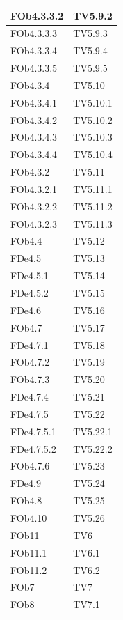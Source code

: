\begin{longtable}{|p{2.5cm}|p{5cm}|}
\hline
FOb4.3.3.2 & TV5.9.2\\
\hline
FOb4.3.3.3 & TV5.9.3\\
\hline
FOb4.3.3.4 & TV5.9.4\\
\hline
FOb4.3.3.5 & TV5.9.5\\
\hline
FOb4.3.4 & TV5.10\\ %
\hline
FOb4.3.4.1 & TV5.10.1\\
\hline
FOb4.3.4.2 & TV5.10.2\\
\hline
FOb4.3.4.3 & TV5.10.3\\
\hline
FOb4.3.4.4 & TV5.10.4\\
\hline
FOb4.3.2 & TV5.11\\ %
\hline
FOb4.3.2.1 & TV5.11.1\\
\hline
FOb4.3.2.2 & TV5.11.2\\
\hline
FOb4.3.2.3 & TV5.11.3\\
\hline
FOb4.4 & TV5.12\\ %
\hline
FDe4.5 & TV5.13\\ %
\hline
FDe4.5.1 & TV5.14\\  %
\hline
FDe4.5.2 & TV5.15\\ %
\hline
FDe4.6 & TV5.16\\ %
\hline
FOb4.7 & TV5.17\\ %
\hline
FDe4.7.1 & TV5.18\\ %
\hline
FOb4.7.2 & TV5.19\\ %
\hline
FOb4.7.3 & TV5.20\\ %
\hline
FDe4.7.4 & TV5.21\\ %
\hline
FDe4.7.5 & TV5.22\\ %
\hline
FDe4.7.5.1 & TV5.22.1\\ %
\hline
FDe4.7.5.2 & TV5.22.2\\ %
\hline 
FOb4.7.6 & TV5.23\\ %
\hline 
FDe4.9 & TV5.24\\ %
\hline
FOb4.8 & TV5.25\\ %
\hline
FOb4.10 & TV5.26\\%
\hline
FOb11 & TV6\\
\hline
FOb11.1 & TV6.1\\
\hline
FOb11.2 & TV6.2\\	
\hline
FOb7 & TV7\\
\hline
FOb8 & TV7.1\\
\hline
\end{longtable}

